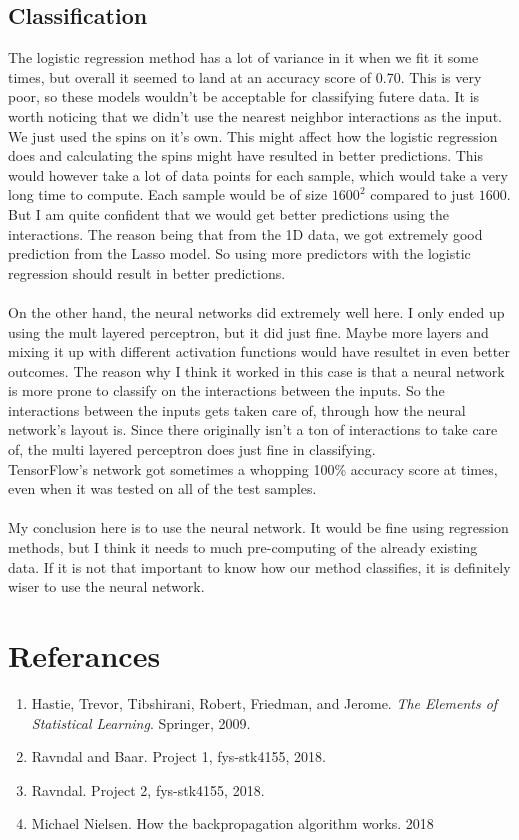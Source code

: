 \documentclass[a4paper,norsk]{article}
\begin{document}
\subsection{Classification}
The logistic regression method has a lot of variance in it when we fit it some times, but overall it seemed to land at an accuracy score of 0.70. This is very poor, so these models wouldn't be acceptable for classifying futere data. It is worth noticing that we didn't use the nearest neighbor interactions as the input. We just used the spins on it's own. This might affect how the logistic regression does and calculating the spins might have resulted in better predictions. This would however take a lot of data points for each sample, which would take a very long time to compute. Each sample would be of size $1600^2$ compared to just $1600$. But I am quite confident that we would get better predictions using the interactions. The reason being that from the 1D data, we got extremely good prediction from the Lasso model. So using more predictors with the logistic regression should result in better predictions.\\
\\
On the other hand, the neural networks did extremely well here. I only ended up using the mult layered perceptron, but it did just fine. Maybe more layers and mixing it up with different activation functions would have resultet in even better outcomes. The reason why I think it worked in this case is that a neural network is more prone to classify on the interactions between the inputs. So the interactions between the inputs gets taken care of, through how the neural network's layout is. Since there originally isn't a ton of interactions to take care of, the multi layered perceptron does just fine in classifying.\\
TensorFlow's network got sometimes a whopping 100\% accuracy score at times, even when it was tested on all of the test samples.\\
\\
My conclusion here is to use the neural network. It would be fine using regression methods, but I think it needs to much pre-computing of the already existing data. If it is not that important to know how our method classifies, it is definitely wiser to use the neural network.

\section*{Referances}
\begin{enumerate}
  \item Hastie, Trevor, Tibshirani, Robert, Friedman, and Jerome. \textit{The Elements of
Statistical Learning}. Springer, 2009.
  \item Ravndal and Baar. Project 1, fys-stk4155, 2018.
  \item Ravndal. Project 2, fys-stk4155, 2018.
  \item Michael Nielsen. How the backpropagation algorithm works. 2018
\end{enumerate}
\end{document}
